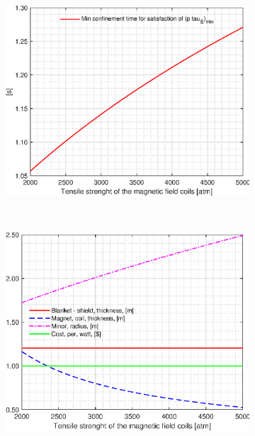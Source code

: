 \begin{figure}[H]
	\centering
	\begin{subfigure}[h!]{.45\textwidth}
		\includegraphics[width=\textwidth]{MatlabFigures/sigmamax/f1.eps}
	\end{subfigure}
	~
	\begin{subfigure}[h!]{.45\textwidth}
		\includegraphics[width=\textwidth]{MatlabFigures/sigmamax/f2.eps}
	\end{subfigure}


\end{figure}
